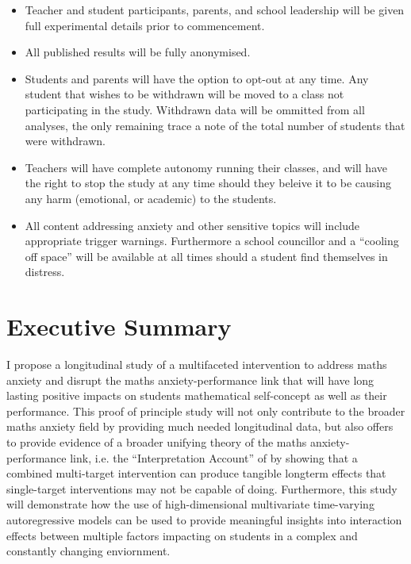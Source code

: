 \documentclass[14pt]{memoir}
\begin{document}
\begin{itemize}
	\item Teacher and student participants, parents, and school leadership will be given full experimental details prior to commencement. 
	\item All published results will be fully anonymised.
	\item Students and parents will have the option to opt-out at any time. Any student that wishes to be withdrawn will be moved to a class not participating in the study. Withdrawn data will be ommitted from all analyses, the only remaining trace a note of the total number of students that were withdrawn.
	\item Teachers will have complete autonomy running their classes, and will have the right to stop the study at any time should they beleive it to be causing any harm (emotional, or academic) to the students.
	\item All content addressing anxiety and other sensitive topics will include appropriate trigger warnings. Furthermore a school councillor and a ``cooling off space'' will be available at all times should a student find themselves in distress.
\end{itemize}


\section{Executive Summary}

I propose a longitudinal study of a multifaceted intervention to address maths anxiety and disrupt the maths anxiety-performance link that will have long lasting positive impacts on students mathematical self-concept as well as their performance. This proof of principle study will not only contribute to the broader maths anxiety field by providing much needed longitudinal data, but also offers to provide evidence of a broader unifying theory of the maths anxiety-performance link, i.e. the ``Interpretation Account'' of  by showing that a combined multi-target intervention can produce tangible longterm effects that single-target interventions may not be capable of doing. Furthermore, this study will demonstrate how the use of high-dimensional multivariate time-varying autoregressive models can be used to provide meaningful insights into interaction effects between multiple factors impacting on students in a complex and constantly changing enviornment. 
\end{document}
